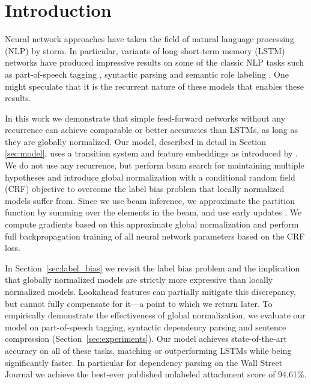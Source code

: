 \section{Introduction}

Neural network approaches have taken the field of
natural language processing (NLP) by storm.
In particular, variants of long short-term memory (LSTM)
networks \cite{hochreiter1997} have produced impressive
results on some of the classic NLP tasks such as
part-of-speech tagging \cite{ling-EtAl:2015:EMNLP},
syntactic parsing \cite{grammarAsForeign} and
semantic role labeling \cite{zhou-xu:2015:ACL}.
One might speculate that it is the recurrent nature
of these models that enables these results.

In this work we demonstrate that simple feed-forward networks without
any recurrence can achieve comparable or better accuracies than LSTMs,
as long as they are globally normalized.  Our model, described in
detail in Section \ref{sec:model}, uses a transition system
\cite{Nivre:2006} and feature embeddings as introduced by
.  We do not use any recurrence, but
perform beam search for maintaining multiple hypotheses and introduce
global normalization with a conditional random field (CRF) objective
\cite{bottou-97,lecun-98h,crf,collobert2011natural}
to overcome the label bias problem that locally normalized models
suffer from.  Since we use beam inference, we approximate
the partition function by summing over the elements in the beam,
and use early updates
\cite{collins-roark:2004:ACL,zhou-etAl:2015:ACL}. We compute gradients
based on this approximate global normalization and perform full
backpropagation training of all neural network parameters based on the
CRF loss.

In Section~\ref{sec:label_bias} we revisit the label bias problem and the implication that
globally normalized models are strictly more expressive than
locally normalized models.
Lookahead features can partially mitigate this discrepancy, but cannot fully
compensate for it---a point to which we return later.
To empirically demonstrate the effectiveness of global normalization, we evaluate our model
on part-of-speech tagging, syntactic dependency parsing
and sentence compression (Section~\ref{sec:experiments}).
Our model achieves state-of-the-art accuracy on all of these tasks,
matching or outperforming LSTMs while being significantly faster.
In particular for dependency parsing on the Wall Street Journal
we achieve the best-ever published unlabeled
attachment score of 94.61\%.

